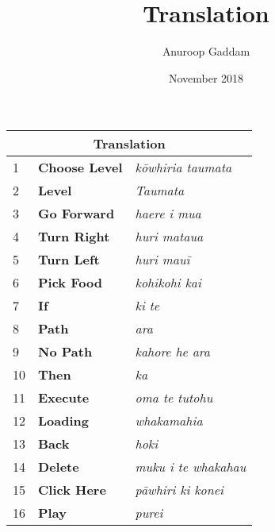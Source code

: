\documentclass{article}
\title{Translation}
\author{Anuroop Gaddam}
\date{November 2018}
\begin{document}
\begin{tabular}{ |p{0.1cm}|p{3cm}|p{3cm}|  }
\hline
\multicolumn{3}{|c|}{Translation} \\
\hline
1&\textbf{Choose Level}&\textit{kōwhiria taumata} \\
\hline
2&\textbf{Level}&\textit{Taumata} \\
\hline
3&\textbf{Go Forward}&\textit{haere i mua} \\
\hline
4&\textbf{Turn Right}&\textit{huri mataua} \\
\hline
5&\textbf{Turn Left}&\textit{huri mauī} \\
\hline
6&\textbf{Pick Food}&\textit{kohikohi kai} \\
\hline
7&\textbf{If}&\textit{ki te} \\
\hline
8&\textbf{Path}&\textit{ara} \\
\hline
9&\textbf{No Path}&\textit{kahore he ara} \\
\hline
10&\textbf{Then}&\textit{ka} \\
\hline
11&\textbf{Execute}&\textit{oma te tutohu} \\
\hline
12&\textbf{Loading}&\textit{whakamahia} \\
\hline
13&\textbf{Back}&\textit{hoki} \\
\hline
14&\textbf{Delete}&\textit{muku i te whakahau} \\
\hline
15&\textbf{Click Here}&\textit{pāwhiri ki konei} \\
\hline
16&\textbf{Play}&\textit{purei} \\
\hline
\end{tabular}
\end{document}
